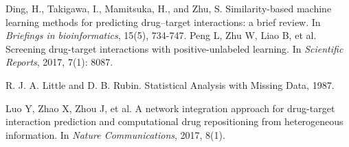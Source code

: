 \documentclass[sigconf,anonymous]{acmart}
\begin{document}
\begin{thebibliography}{10}
Ding, H., Takigawa, I., Mamitsuka, H., and Zhu, S. 
\newblock Similarity-based machine learning methods for predicting drug–target interactions: a brief review. \newblock In {\em Briefings in bioinformatics}, 15(5), 734-747.
Peng L, Zhu W, Liao B, et al. 
\newblock Screening drug-target interactions with positive-unlabeled learning. 
\newblock In {\em Scientific Reports}, 2017, 7(1): 8087.

R. J. A. Little and D. B. Rubin. 
\newblock Statistical Analysis with Missing Data, 1987.

Luo Y, Zhao X, Zhou J, et al. 
\newblock A network integration approach for drug-target interaction prediction and computational drug repositioning from heterogeneous information. 
\newblock In {\em Nature Communications}, 2017, 8(1).

\end{thebibliography}
\end{document}
